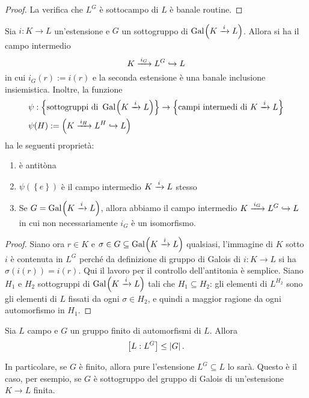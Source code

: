 \begin{proof}
La verifica che \(L^G\) è sottocampo di \(L\) è banale routine.
\end{proof}

\begin{prop}\label{prop:CorrispondenzaGaloisII}
Sia \(i : K \to L\) un'estensione e \(G\) un sottogruppo di \(\operatorname{Gal}_{}\!\left(K \xrightarrow{\,i\,} L\right)\). Allora si ha il campo intermedio
\[K \xrightarrow{\,i_G\,} L^G \hookrightarrow L\]
in cui \(i_G(r) := i(r)\) e la seconda estensione è una banale inclusione insiemistica. Inoltre, la funzione
\begin{align*}
& \psi : \left\{ \text{sottogruppi di } \operatorname{Gal}_{}\!\left(K \xrightarrow{\,i\,} L\right) \right\} \to \left\{ \text{campi intermedi di } K \xrightarrow{\,i\,} L \right\} \\
& \psi(H) := \left(K \xrightarrow{\,i_H\,} L^H \hookrightarrow L \right)
\end{align*}
ha le seguenti proprietà:
\begin{enumerate}
\item è antitòna
\item \(\psi(\left\{e\right\})\) è il campo intermedio \(K \xrightarrow{\,i\,} L\) stesso
\item Se \(G = \operatorname{Gal}_{}\!\left(K \xrightarrow{\,i\,} L\right)\), allora abbiamo il campo intermedio \(K \xrightarrow{\,i_G\,} L^G \hookrightarrow L\) in cui non necessariamente \(i_G\) è un isomorfismo. %
\end{enumerate}
\end{prop}

\begin{proof}
Siano ora \(r \in K\) e \(\sigma \in G \subseteq \operatorname{Gal}_{}\!\left(K \xrightarrow{\,i\,} L\right)\) qualsiasi, l'immagine di \(K\) sotto \(i\) è contenuta in \(L^G\) perché da definizione di gruppo di Galois di \(i : K \to L\) si ha \(\sigma(i(r)) = i(r)\). Qui il lavoro per il controllo dell'antitonia è semplice. Siano \(H_1\) e \(H_2\) sottogruppi di \(\operatorname{Gal}_{}\!\left(K \xrightarrow{\,i\,} L\right)\) tali che \(H_1 \subseteq H_2\): gli elementi di \(L^{H_2}\) sono gli elementi di \(L\) fissati da ogni \(\sigma \in H_2\), e quindi a maggior ragione da ogni automorfismo in \(H_1\). 
\end{proof}

\begin{lemm}[di E. Artin]\label{lemm:Artin}
Sia \(L\) campo e \(G\) un gruppo finito di automorfismi di \(L\). Allora
\[\left[L:L^G\right] \le \left\lvert G\right\rvert .\]
\end{lemm}

In particolare, se \(G\) è finito, allora pure l'estensione \(L^G \subseteq L\) lo sarà. Questo è il caso, per esempio, se \(G\) è sottogruppo del gruppo di Galois di un'estensione \(K \to L\) finita.

